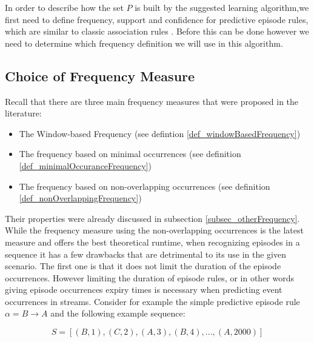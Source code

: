 In order to describe how the set $P$ is built by the suggested learning algorithm,we first need to define frequency, support and confidence for predictive episode rules, which are similar to classic association rules \cite{agrawal1994fast}. Before this can be done however we need to determine which frequency definition we will use in this algorithm. 

\subsection{Choice of Frequency Measure}

Recall that there are three main frequency measures that were proposed in the literature:

\begin{itemize}
	\item The Window-based Frequency (see defintion \ref{def_windowBasedFrequency})
	\item The frequency based on minimal occurrences (see definition \ref{def_minimalOccuranceFrequency})
	\item The frequency based on non-overlapping occurrences (see definition \ref{def_nonOverlappingFrequency})
\end{itemize}

Their properties were already discussed in subsection \ref{subsec_otherFrequency}. While the frequency measure using the non-overlapping occurrences is the latest measure and offers the best theoretical runtime, when recognizing episodes in a sequence it has a few drawbacks that are detrimental to its use in the given scenario. The first one is that it does not limit the duration of the episode occurrences. However limiting the duration of episode rules, or in other words giving episode occurrences expiry times is necessary when predicting event occurrences in streams. Consider for example the simple predictive episode rule $\alpha = B \rightarrow A$ and the following example sequence: 

\begin{equation}
S = [ (B,1),(C,2),(A,3),(B,4),...,(A,2000) ] 
\end{equation}

